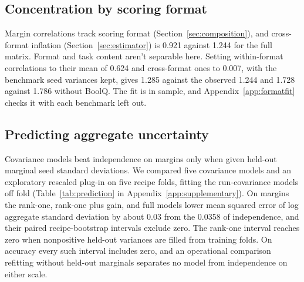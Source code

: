 
\subsection{Concentration by scoring format}
Margin correlations track scoring format (Section~\ref{sec:composition}), and cross-format inflation (Section~\ref{sec:estimator}) is 0.921 against 1.244 for the full matrix. Format and task content aren't separable here. Setting within-format correlations to their mean of 0.624 and cross-format ones to 0.007, with the benchmark seed variances kept, gives 1.285 against the observed 1.244 and 1.728 against 1.786 without BoolQ. The fit is in sample, and Appendix~\ref{app:formatfit} checks it with each benchmark left out.

\subsection{Predicting aggregate uncertainty}
\label{sec:prediction}
Covariance models beat independence on margins only when given held-out marginal seed standard deviations. We compared five covariance models and an exploratory rescaled plug-in on five recipe folds, fitting the run-covariance models off fold (Table~\ref{tab:prediction} in Appendix~\ref{app:supplementary}). On margins the rank-one, rank-one plus gain, and full models lower mean squared error of log aggregate standard deviation by about 0.03 from the 0.0358 of independence, and their paired recipe-bootstrap intervals exclude zero. The rank-one interval reaches zero when nonpositive held-out variances are filled from training folds. On accuracy every such interval includes zero, and an operational comparison refitting without held-out marginals separates no model from independence on either scale.

